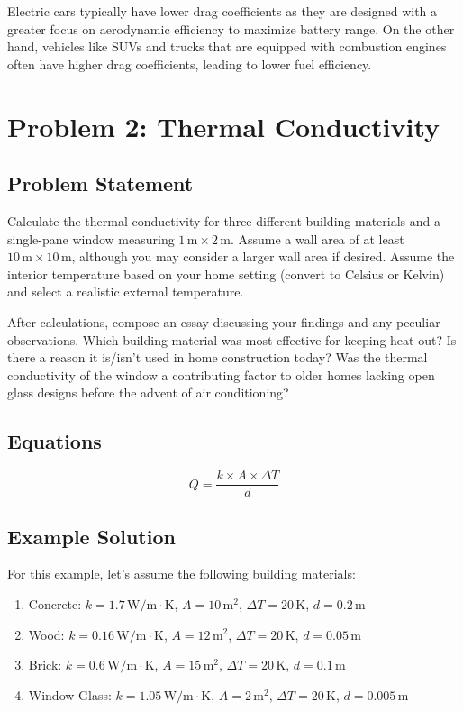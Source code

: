 \documentclass[12pt]{article}
\begin{document}
Electric cars typically have lower drag coefficients as they are designed with a greater focus on aerodynamic efficiency to maximize battery range. On the other hand, vehicles like SUVs and trucks that are equipped with combustion engines often have higher drag coefficients, leading to lower fuel efficiency.




\newpage
\section*{Problem 2: Thermal Conductivity}

\subsection*{Problem Statement}
Calculate the thermal conductivity for three different building materials and a single-pane window measuring \(1 \, \text{m} \times 2 \, \text{m}\). Assume a wall area of at least \(10 \, \text{m} \times 10 \, \text{m}\), although you may consider a larger wall area if desired. Assume the interior temperature based on your home setting (convert to Celsius or Kelvin) and select a realistic external temperature. 
\newline

After calculations, compose an essay discussing your findings and any peculiar observations. Which building material was most effective for keeping heat out? Is there a reason it is/isn't used in home construction today? Was the thermal conductivity of the window a contributing factor to older homes lacking open glass designs before the advent of air conditioning? 

\subsection*{Equations}
\[
Q = \frac{k \times A \times \Delta T}{d}
\]
\newpage
\subsection*{Example Solution}

For this example, let's assume the following building materials:

\begin{enumerate}[label=\alph*.]
    \item Concrete: \( k = 1.7 \, \text{W/m}\cdot\text{K}\), \( A = 10 \, \text{m}^2 \), \( \Delta T = 20 \, \text{K} \), \( d = 0.2 \, \text{m} \)
    \item Wood: \( k = 0.16 \, \text{W/m}\cdot\text{K}\), \( A = 12 \, \text{m}^2 \), \( \Delta T = 20 \, \text{K} \), \( d = 0.05 \, \text{m} \)
    \item Brick: \( k = 0.6 \, \text{W/m}\cdot\text{K}\), \( A = 15 \, \text{m}^2 \), \( \Delta T = 20 \, \text{K} \), \( d = 0.1 \, \text{m} \)
    \item Window Glass: \( k = 1.05 \, \text{W/m}\cdot\text{K}\), \( A = 2 \, \text{m}^2 \), \( \Delta T = 20 \, \text{K} \), \( d = 0.005 \, \text{m} \)
\end{enumerate}
\end{document}
